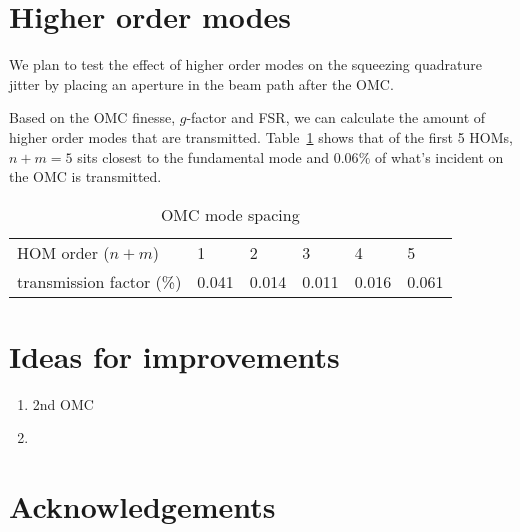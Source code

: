 \documentclass{ligodoc}
\begin{document}
\section{Higher order modes}
We plan to test the effect of higher order modes on the squeezing
quadrature jitter by placing an aperture in the beam path after the
OMC.

Based on the OMC finesse, $g$-factor and FSR, we can calculate the
amount of higher order modes that are
transmitted. Table~\ref{tab:HOMtrans} shows that of the first 5 HOMs,
$n+m=5$ sits closest to the fundamental mode and $0.06\%$ of what's
incident on the OMC is transmitted.


\begin{table}
\centering
\caption{OMC mode spacing}
\begin{tabular}{l| l l l l l}
\hline
HOM order ($n+m$) & 1 & 2 & 3 & 4 & 5 \\
transmission factor (\%) &  0.041 & 0.014 & 0.011 & 0.016 & 0.061 \\
\hline
\end{tabular}
\label{tab:HOMtrans}
\end{table}



\section{Ideas for improvements}

\begin{enumerate}
\item 2nd OMC
\item 

\end{enumerate}



\section{Acknowledgements}
\end{document}
